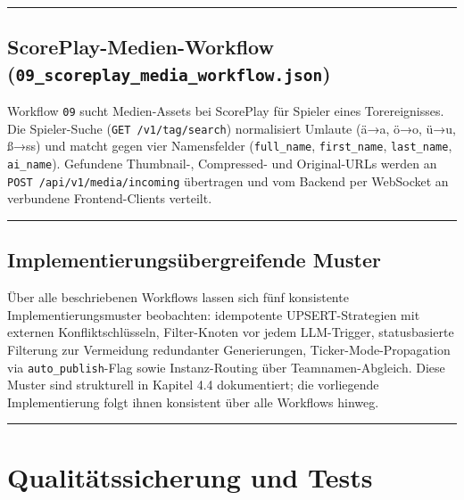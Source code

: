 \begin{center}\rule{0.5\linewidth}{0.5pt}\end{center}

\subsection{\texorpdfstring{ScorePlay-Medien-Workflow
(\texttt{09\_scoreplay\_media\_workflow.json})}{ScorePlay-Medien-Workflow (09\_scoreplay\_media\_workflow.json)}}\label{scoreplay-medien-workflow-09_scoreplay_media_workflow.json}

Workflow \texttt{09} sucht Medien-Assets bei ScorePlay für Spieler eines
Torereignisses. Die Spieler-Suche (\texttt{GET\ /v1/tag/search})
normalisiert Umlaute (ä→a, ö→o, ü→u, ß→ss) und matcht gegen vier
Namensfelder (\texttt{full\_name}, \texttt{first\_name},
\texttt{last\_name}, \texttt{ai\_name}). Gefundene Thumbnail-,
Compressed- und Original-URLs werden an
\texttt{POST\ /api/v1/media/incoming} übertragen und vom Backend per
WebSocket an verbundene Frontend-Clients verteilt.

\begin{center}\rule{0.5\linewidth}{0.5pt}\end{center}

\subsection{Implementierungsübergreifende
Muster}\label{implementierungsuxfcbergreifende-muster}

Über alle beschriebenen Workflows lassen sich fünf konsistente
Implementierungsmuster beobachten: idempotente UPSERT-Strategien mit
externen Konfliktschlüsseln, Filter-Knoten vor jedem LLM-Trigger,
statusbasierte Filterung zur Vermeidung redundanter Generierungen,
Ticker-Mode-Propagation via \texttt{auto\_publish}-Flag sowie
Instanz-Routing über Teamnamen-Abgleich. Diese Muster sind
strukturell in Kapitel 4.4 dokumentiert; die vorliegende
Implementierung folgt ihnen konsistent über alle Workflows hinweg.

\begin{center}\rule{0.5\linewidth}{0.5pt}\end{center}

\section{Qualitätssicherung und
Tests}\label{qualituxe4tssicherung-und-tests}

